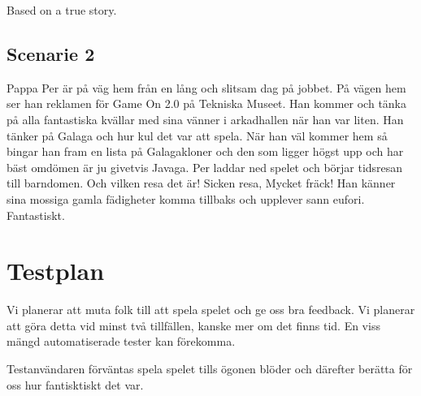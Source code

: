 \documentclass[a4paper,11pt]{article}
\begin{document}
\noindent
Based on a true story.

\subsection{Scenarie 2}
Pappa Per är på väg hem från en lång och slitsam dag på jobbet. På vägen hem ser han reklamen för Game On 2.0 på Tekniska Museet. Han kommer och tänka på alla fantastiska kvällar med sina vänner i arkadhallen när han var liten. Han tänker på Galaga och hur kul det var att spela. När han väl kommer hem så bingar han fram en lista på Galagakloner och den som ligger högst upp och har bäst omdömen är ju givetvis Javaga. Per laddar ned spelet och börjar tidsresan till barndomen. Och vilken resa det är! Sicken resa, Mycket fräck! Han känner sina mossiga gamla fädigheter komma tillbaks och upplever sann eufori. Fantastiskt.

\section{Testplan}
Vi planerar att muta folk till att spela spelet och ge oss bra feedback. Vi planerar att göra detta vid minst två tillfällen, kanske mer om det finns tid. En viss mängd automatiserade tester kan förekomma.

Testanvändaren förväntas spela spelet tills ögonen blöder och därefter berätta för oss hur fantisktiskt det var. 
\end{document}
